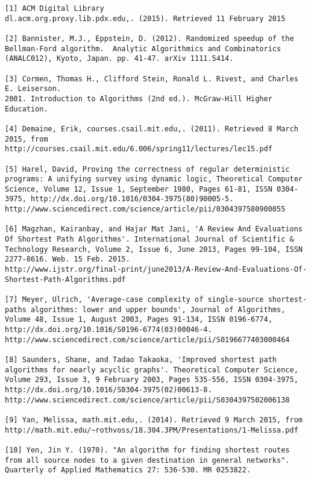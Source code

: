 \documentclass{article}
\begin{document}
\begin{lstlisting}
[1] ACM Digital Library
dl.acm.org.proxy.lib.pdx.edu,. (2015). Retrieved 11 February 2015

[2] Bannister, M.J., Eppstein, D. (2012). Randomized speedup of the Bellman-Ford algorithm.  Analytic Algorithmics and Combinatorics (ANALC012), Kyoto, Japan. pp. 41-47. arXiv 1111.5414.

[3] Cormen, Thomas H., Clifford Stein, Ronald L. Rivest, and Charles E. Leiserson.
2001. Introduction to Algorithms (2nd ed.). McGraw-Hill Higher Education. 

[4] Demaine, Erik, courses.csail.mit.edu,. (2011). Retrieved 8 March 2015, from http://courses.csail.mit.edu/6.006/spring11/lectures/lec15.pdf

[5] Harel, David, Proving the correctness of regular deterministic programs: A unifying survey using dynamic logic, Theoretical Computer Science, Volume 12, Issue 1, September 1980, Pages 61-81, ISSN 0304-3975, http://dx.doi.org/10.1016/0304-3975(80)90005-5.
http://www.sciencedirect.com/science/article/pii/0304397580900055

[6] Magzhan, Kairanbay, and Hajar Mat Jani, 'A Review And Evaluations Of Shortest Path Algorithms'. International Journal of Scientific & Technology Research, Volume 2, Issue 6, June 2013, Pages 99-104, ISSN 2277-8616. Web. 15 Feb. 2015.
http://www.ijstr.org/final-print/june2013/A-Review-And-Evaluations-Of-Shortest-Path-Algorithms.pdf

[7] Meyer, Ulrich, 'Average-case complexity of single-source shortest-paths algorithms: lower and upper bounds', Journal of Algorithms, Volume 48, Issue 1, August 2003, Pages 91-134, ISSN 0196-6774, http://dx.doi.org/10.1016/S0196-6774(03)00046-4.
http://www.sciencedirect.com/science/article/pii/S0196677403000464

[8] Saunders, Shane, and Tadao Takaoka, 'Improved shortest path algorithms for nearly acyclic graphs'. Theoretical Computer Science, Volume 293, Issue 3, 9 February 2003, Pages 535-556, ISSN 0304-3975, http://dx.doi.org/10.1016/S0304-3975(02)00613-8.
http://www.sciencedirect.com/science/article/pii/S0304397502006138

[9] Yan, Melissa, math.mit.edu,. (2014). Retrieved 9 March 2015, from http://math.mit.edu/~rothvoss/18.304.3PM/Presentations/1-Melissa.pdf

[10] Yen, Jin Y. (1970). "An algorithm for finding shortest routes from all source nodes to a given destination in general networks". Quarterly of Applied Mathematics 27: 536-530. MR 0253822.


\end{lstlisting}
\end{document}
